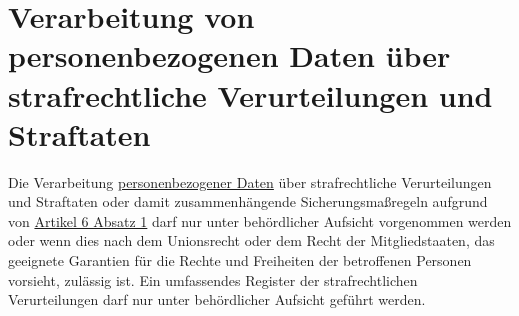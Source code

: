 \chapter{Verarbeitung von personenbezogenen Daten über strafrechtliche Verurteilungen und Straftaten}
\label{ch:10}


Die Verarbeitung \hyperref[itm:04-1]{personenbezogener Daten} über strafrechtliche Verurteilungen und Straftaten oder damit zusammenhängende
Sicherungsmaßregeln aufgrund von \hyperref[itm:06-1]{Artikel 6 Absatz 1} darf nur unter behördlicher Aufsicht
vorgenommen werden oder wenn dies nach dem Unionsrecht oder dem Recht der Mitgliedstaaten, das geeignete Garantien für
die Rechte und Freiheiten der betroffenen Personen vorsieht, zulässig ist. Ein umfassendes Register der
strafrechtlichen Verurteilungen darf nur unter behördlicher Aufsicht geführt werden.


